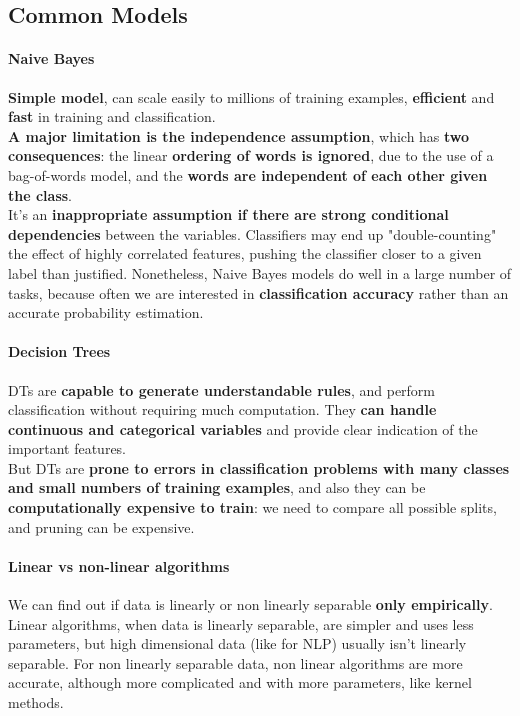 \documentclass[10pt]{report}
\begin{document}
\subsection{Common Models}
\paragraph{Naive Bayes} \textbf{Simple model}, can scale easily to millions of training examples, \textbf{efficient} and \textbf{fast} in training and classification.\\
\textbf{A major limitation is the independence assumption}, which has \textbf{two consequences}: the linear \textbf{ordering of words is ignored}, due to the use of a bag-of-words model, and the \textbf{words are independent of each other given the class}.\\
It's an \textbf{inappropriate assumption if there are strong conditional dependencies} between the variables. Classifiers may end up "double-counting" the effect of highly correlated features, pushing the classifier closer to a given label than justified. Nonetheless, Naive Bayes models do well in a large number of tasks, because often we are interested in \textbf{classification accuracy} rather than an accurate probability estimation.
\paragraph{Decision Trees} DTs are \textbf{capable to generate understandable rules}, and perform classification without requiring much computation. They \textbf{can handle continuous and categorical variables} and provide clear indication of the important features.\\
But DTs are \textbf{prone to errors in classification problems with many classes and small numbers of training examples}, and also they can be \textbf{computationally expensive to train}: we need to compare all possible splits, and pruning can be expensive.
\paragraph{Linear vs non-linear algorithms} We can find out if data is linearly or non linearly separable \textbf{only empirically}.\\
Linear algorithms, when data is linearly separable, are simpler and uses less parameters, but high dimensional data (like for NLP) usually isn't linearly separable. For non linearly separable data, non linear algorithms are more accurate, although more complicated and with more parameters, like kernel methods.
\end{document}

